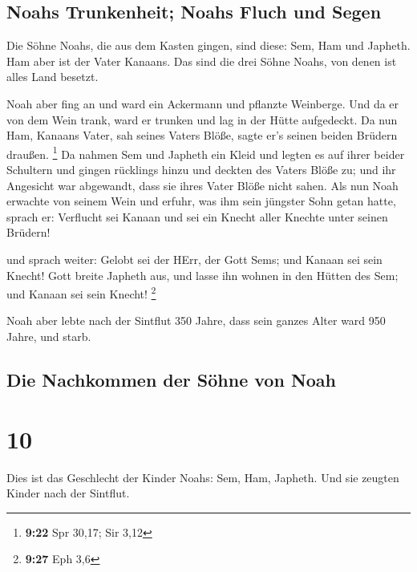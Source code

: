 \hypertarget{noahs-trunkenheit-noahs-fluch-und-segen}{%
\subsection{Noahs Trunkenheit; Noahs Fluch und
Segen}\label{noahs-trunkenheit-noahs-fluch-und-segen}}

 Die Söhne Noahs, die aus dem Kasten gingen, sind diese:
Sem, Ham und Japheth. Ham aber ist der Vater Kanaans. 
Das sind die drei Söhne Noahs, von denen ist alles Land besetzt.

 Noah aber fing an und ward ein Ackermann und pflanzte
Weinberge.  Und da er von dem Wein trank, ward er trunken
und lag in der Hütte aufgedeckt.  Da nun Ham, Kanaans
Vater, sah seines Vaters Blöße, sagte er's seinen beiden Brüdern
draußen. \footnote{\textbf{9:22} Spr 30,17; Sir 3,12}  Da
nahmen Sem und Japheth ein Kleid und legten es auf ihrer beider
Schultern und gingen rücklings hinzu und deckten des Vaters Blöße zu;
und ihr Angesicht war abgewandt, dass sie ihres Vater Blöße nicht sahen.
 Als nun Noah erwachte von seinem Wein und erfuhr, was
ihm sein jüngster Sohn getan hatte,  sprach er: Verflucht
sei Kanaan und sei ein Knecht aller Knechte unter seinen Brüdern!

 und sprach weiter: Gelobt sei der HErr, der Gott Sems;
und Kanaan sei sein Knecht!  Gott breite Japheth aus, und
lasse ihn wohnen in den Hütten des Sem; und Kanaan sei sein Knecht!
\footnote{\textbf{9:27} Eph 3,6}

 Noah aber lebte nach der Sintflut 350 Jahre,
 dass sein ganzes Alter ward 950 Jahre, und starb.

\hypertarget{die-nachkommen-der-suxf6hne-von-noah}{%
\subsection{Die Nachkommen der Söhne von
Noah}\label{die-nachkommen-der-suxf6hne-von-noah}}

\hypertarget{section-9}{%
\section{10}\label{section-9}}

 Dies ist das Geschlecht der Kinder Noahs: Sem, Ham,
Japheth. Und sie zeugten Kinder nach der Sintflut.


